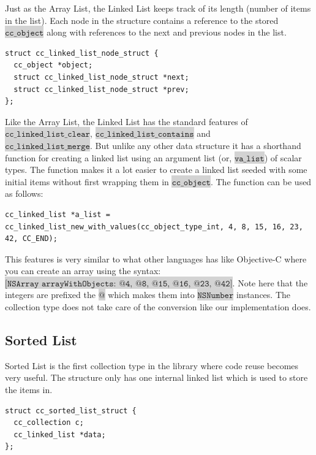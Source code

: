 \documentclass[table]{ituthesis}
\newcommand{\highlight}[1]{\colorbox{lightGray}{$\displaystyle \texttt{#1}$}}
\begin{document}
	Just as the Array List, the Linked List keeps track of its length (number of items in the list). Each node in the structure contains a reference to the stored \highlight{cc\_object} along with references to the next and previous nodes in the list.
	
\begin{lstlisting}[label=cc_linked_list-struct,caption=Internal representation of Linked List node]
struct cc_linked_list_node_struct {
  cc_object *object;
  struct cc_linked_list_node_struct *next;
  struct cc_linked_list_node_struct *prev;
};
\end{lstlisting}

	Like the Array List, the Linked List has the standard features of \highlight{cc\_linked\_list\_clear}, \highlight{cc\_linked\_list\_contains} and \\\highlight{cc\_linked\_list\_merge}. But unlike any other data structure it has a shorthand function for creating a linked list using an argument list (or, \highlight{va\_list}) of scalar types. The function makes it a lot easier to create a linked list seeded with some initial items without first wrapping them in \highlight{cc\_object}. The function can be used as follows:
	
\begin{lstlisting}[label=cc_linked_list-struct,caption=Creating a linked list with an argument list]
cc_linked_list *a_list = cc_linked_list_new_with_values(cc_object_type_int, 4, 8, 15, 16, 23, 42, CC_END);
\end{lstlisting}

	This features is very similar to what other languages has like Objective-C where you can create an array using the syntax:\\
	\highlight{[NSArray arrayWithObjects: @4, @8, @15, @16, @23, @42]}. Note here that the integers are prefixed the \highlight{@} which makes them into \highlight{NSNumber} instances. The collection type does not take care of the conversion like our implementation does.
	
	\subsection{Sorted List}
	
	Sorted List is the first collection type in the library where code reuse becomes very useful. The structure only has one internal linked list which is used to store the items in.
	
\begin{lstlisting}[label=cc_sorted_list-struct,caption=Internal representation of Sorted List]
struct cc_sorted_list_struct {
  cc_collection c;
  cc_linked_list *data;
};
\end{lstlisting}
\end{document}
